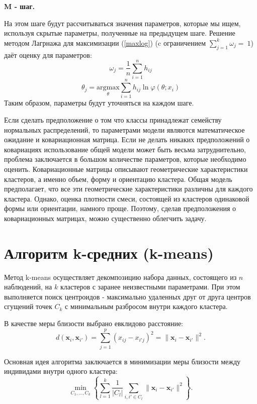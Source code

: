 \documentclass[10pt]{article}
\begin{document}
\textbf{M - шаг.}

На этом шаге будут рассчитываться значения параметров, которые мы ищем, используя скрытые параметры, полученные на предыдущем шаге. Решение методом Лагрнажа для максимизации (\ref{maxlog}) (c ограничением $\sum\limits_{j=1}^k\omega_{j}=~1$) даёт оценку для параметров:
\begin{equation}
\omega_{j} = \frac{1}{n} \sum\limits_{i=1}^n h_{ij}
\end{equation}
\begin{equation}
\theta_{j} = \underset{\theta}{\text{argmax}} \sum\limits_{i=1}^n h_{ij} \ln{\varphi(\theta; x_{i})}
\end{equation}
Таким образом, параметры будут уточняться на каждом шаге.

Если сделать предположение о том что классы принадлежат семейству нормальных распределений, то параметрами модели являются математическое ожидание и ковариационная матрица. Если не делать никаких предположений о ковариациях использование общей модели может быть весьма затруднительно, проблема заключается в большом количестве параметров, которые необходимо оценить. Ковариационные матрицы описывают геометрические характеристики кластеров, а именно объем, форму и ориентацию кластера. Общая модель предполагает, что все эти геометрические характеристики различны для каждого кластера. Однако, оценка плотности смеси, состоящей из кластеров одинаковой формы или ориентации, намного проще. Поэтому, сделав предположения о ковариационных матрицах, можно существенно облегчить задачу.

\section{Алгоритм k-средних (k-means)}
	Метод k-means осуществляет декомпозицию набора данных, состоящего из $n$ наблюдений, на $k$ кластеров с заранее неизвестными параметрами. При этом выполняется поиск центроидов - максимально удаленных друг от друга центров сгущений точек $C_k$ с минимальным разбросом внутри каждого кластера. 
	
	В качестве меры близости выбрано евклидово расстояние: $$ d(\pmb x_{i}, \pmb x_{i'}) = \sum\limits_{j=1}^p (x_{ij} - x_{i'j})^{2} = \| \pmb x_{i} - \pmb x_{i'} \|^{2}. $$
	
	Основная идея алгоритма заключается в минимизации меры близости между индивидами внутри одного кластера: $$ \underset{C_{1},\ldots, C_{k}}\min \left\{ \sum\limits_{l=1}^k \frac{1}{|C_{l}|} \sum\limits_{i,i' \in C_{l}} \| \pmb x_{i} - \pmb x_{i'} \|^{2} \right\}. $$
	
\end{document}

